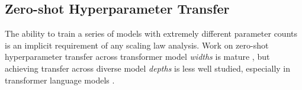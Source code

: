 \subsection{Zero-shot Hyperparameter Transfer}\label{sec:mup-relwork}

The ability to train a series of models with extremely different parameter counts is an implicit requirement of any scaling law analysis. Work on zero-shot hyperparameter transfer across transformer model \textit{widths} is mature \citep{yang2021zero,everett2024scaling,hayou2023width,cerebras2024mupguide}, but achieving transfer across diverse model \textit{depths} is less well studied, especially in transformer language models \citep{bordelon2024depthwise}. %